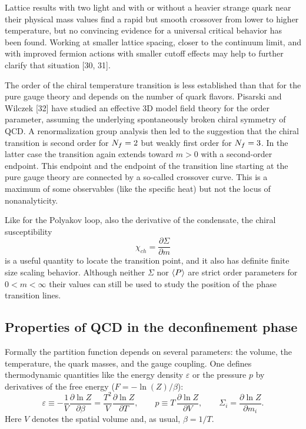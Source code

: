Lattice results with two light and with or without a heavier strange quark near
their physical mass values find a rapid but smooth crossover from lower to
higher temperature, but no convincing evidence for a universal critical
behavior has been found. Working at smaller lattice spacing, closer to the
continuum limit, and with improved fermion actions with smaller cutoff effects
may help to further clarify that situation [30, 31].

The order of the chiral temperature transition is less established than that
for the pure gauge theory and depends on the number of quark flavors. Pisarski
and Wilczek [32] have studied an effective 3D model field theory for the order
parameter, assuming the underlying spontaneously broken chiral symmetry of QCD.
A renormalization group analysis then led to the suggestion that the chiral
transition is second order for $N_f = 2$ but weakly first order for $N_f = 3$.
In the latter case the transition again extends toward $m > 0$ with a
second-order endpoint. This endpoint and the endpoint of the transition line
starting at the pure gauge theory are connected by a so-called crossover curve.
This is a maximum of some observables (like the specific heat) but not the
locus of nonanalyticity.

Like for the Polyakov loop, also the derivative of the condensate, the chiral
susceptibility
\begin{equation}
  \chi_{ch} = \frac{\partial\Sigma}{\partial m}
\end{equation}
is a useful quantity to locate the transition point, and it also has definite
finite size scaling behavior. Although neither $\Sigma$ nor $\left\langle P \right\rangle$ are strict
order parameters for $0 < m < \infty$ their values can still be used to study
the position of the phase transition lines.

\subsection{Properties of QCD in the deconfinement phase}

Formally the partition function depends on several parameters: the volume, the
temperature, the quark masses, and the gauge coupling. One defines
thermodynamic quantities like the energy density $\varepsilon$ or the pressure
$p$ by derivatives of the free energy ($F = -\ln(Z)/\beta$):
\begin{equation}
  \varepsilon \equiv -\frac{1}{V}\frac{\partial\ln Z}{\partial\beta}
    = \frac{T^2}{V}\frac{\partial\ln Z}{\partial T},
  \qquad
  p \equiv T\,\frac{\partial\ln Z}{\partial V},
  \qquad
  \Sigma_i = \frac{\partial\ln Z}{\partial m_i}.
\end{equation}
Here $V$ denotes the spatial volume and, as usual, $\beta = 1/T$.

